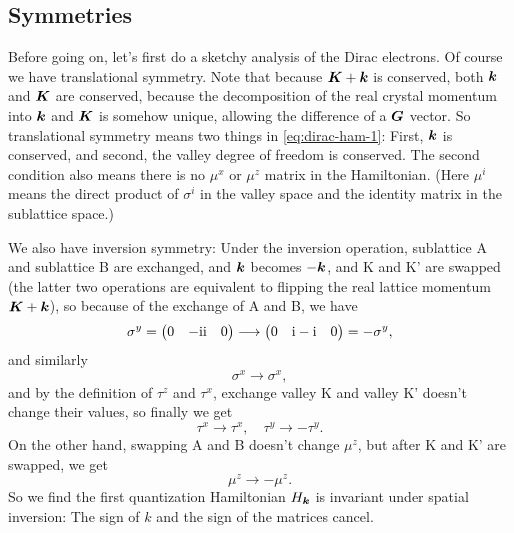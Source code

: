 \documentclass[hyperref, a4paper]{article}
\newcommand*{\ii}{\mathrm{i}}
\def\\{}%
\begin{document}
\subsection{Symmetries}

Before going on, let's first do a sketchy analysis of the Dirac electrons.
Of course we have translational symmetry.
Note that because $\vb*{K} + \vb*{k}$ is conserved,
both $\vb*{k}$ and $\vb*{K}$ are conserved, 
because the decomposition of the real crystal momentum into $\vb*{k}$ and $\vb*{K}$
is somehow unique, allowing the difference of a $\vb*{G}$ vector.
So translational symmetry means two things in \eqref{eq:dirac-ham-1}:
First, $\vb*{k}$ is conserved,
and second, the valley degree of freedom is conserved.
The second condition also means there is no $\mu^x$ or $\mu^z$ matrix in the Hamiltonian.
(Here $\mu^i$ means 
the direct product of $\sigma^i$ in the valley space 
and the identity matrix in the sublattice space.)

We also have inversion symmetry:
Under the inversion operation, sublattice A and sublattice B are exchanged,
and $\vb*{k}$ becomes $- \vb*{k}$,
and K and K' are swapped 
(the latter two operations are equivalent to flipping the real lattice momentum $\vb*{K} + \vb*{k}$),
so because of the exchange of A and B, we have
\[
    \sigma^y = \pmqty{0 & - \ii \\ \ii & 0} \longrightarrow \pmqty{0 & \ii \\ - \ii & 0} = - \sigma^y,
\]
and similarly 
\[
    \sigma^x \longrightarrow \sigma^x,
\]
and by the definition of $\tau^z$ and $\tau^x$, 
exchange valley K and valley K' doesn't change their values, so finally we get
\begin{equation}
    \tau^x \to \tau^x, \quad \tau^y \to - \tau^y.
\end{equation}
On the other hand, swapping A and B doesn't change $\mu^z$,
but after K and K' are swapped, we get 
\begin{equation}
    \mu^z \to - \mu^z.
\end{equation}
So we find the first quantization Hamiltonian $H_{\vb*{k}}$ is invariant under spatial inversion:
The sign of $k$ and the sign of the matrices cancel.
\end{document}
